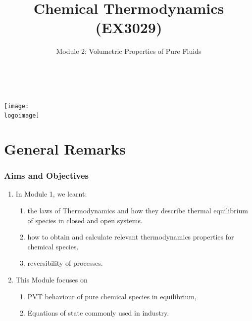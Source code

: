 \documentclass[10pt,compress]{beamer}
\institute{School of Engineering}
\title{Chemical Thermodynamics (EX3029)}
\subtitle{Module 2: Volumetric Properties of Pure Fluids}
\date[ ]{ }
\author[\shortname]{%
  \fullname\\\ttfamily{\emailaddress}
}
\newcommand{\logoimage}{../../FigBanner/UoAHorizBanner}
\begin{document}
\begin{frame}
  \titlepage
  \vfill%
  \begin{center}
    \texttt{[image: \\logoimage]}
  \end{center}
\end{frame}





\section{General Remarks}

\begin{frame}
 \frametitle{Aims and Objectives}
   \begin{enumerate}
     \item<1-> In Module 1, we learnt:
       \begin{enumerate}
         \item<1-> the laws of Thermodynamics and how they describe thermal equilibrium of species in closed and open systems.
         \item<1-> how to obtain and calculate relevant thermodynamics properties for chemical species.
         \item<1-> reversibility  of processes.
       \end{enumerate} 
     \item<2-> This Module focuses on 
         \begin{enumerate}
           \item<2-> PVT behaviour of pure chemical species in equilibrium,
           \item<2-> Equations of state commonly used in industry.
         \end{enumerate}
   \end{enumerate}

\end{frame}


\end{document}
